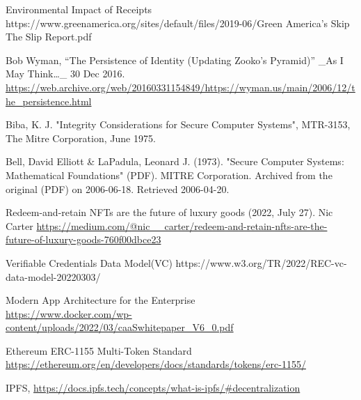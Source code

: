 \documentclass[a4paper,onecolumn, 10.5pt]{article}
\begin{document}
	
\begin{thebibliography}{9}
	 
	Environmental Impact of Receipts https://www.greenamerica.org/sites/default/files/2019-06/Green America’s Skip The Slip Report.pdf 
	

	
	Bob Wyman, “The Persistence of Identity (Updating Zooko's Pyramid)” \_As I May Think…\_ 30 Dec 2016. \url{https://web.archive.org/web/20160331154849/https://wyman.us/main/2006/12/the_persistence.html}	
	
	Biba, K. J. "Integrity Considerations for Secure Computer Systems", MTR-3153, The Mitre Corporation, June 1975.
	
	Bell, David Elliott \& LaPadula, Leonard J. (1973). "Secure Computer Systems: Mathematical Foundations" (PDF). MITRE Corporation. Archived from the original (PDF) on 2006-06-18. Retrieved 2006-04-20.
	
	Redeem-and-retain NFTs are the future of luxury goods (2022, July 27). Nic Carter
	\url{https://medium.com/@nic__carter/redeem-and-retain-nfts-are-the-future-of-luxury-goods-760f00dbce23}

	Verifiable Credentials Data Model(VC) https://www.w3.org/TR/2022/REC-vc-data-model-20220303/

	Modern App Architecture for the Enterprise \\
	\url{https://www.docker.com/wp-content/uploads/2022/03/caaSwhitepaper_V6_0.pdf}

	Ethereum ERC-1155 Multi-Token Standard \\ \url{https://ethereum.org/en/developers/docs/standards/tokens/erc-1155/}

   IPFS, \url{https://docs.ipfs.tech/concepts/what-is-ipfs/#decentralization}
	
	
\end{thebibliography}
	
\end{document}
